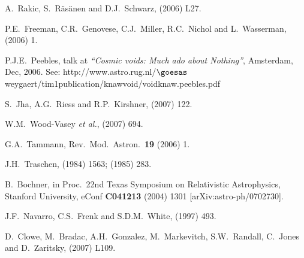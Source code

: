 \documentclass[12pt]{iopart}
\begin{document}
\begin{thebibliography}{66}
A.~Rakic, S.~R\"as\"anen and D.J.~Schwarz,
 (2006) L27. %

P.E.~Freeman, C.R.~Genovese, C.J.~Miller, R.C.~Nichol and L.~Wasserman,
 (2006) 1. %

P.J.E.~Peebles,
talk at {\em``Cosmic voids: Much ado about Nothing''}, Amsterdam,
Dec, 2006. See:\hfil\break
http://www.astro.rug.nl/$\goesas$weygaert/tim1publication/knawvoid/voidknaw.peebles.pdf

S.~Jha, A.G.~Riess and R.P.~Kirshner,
 (2007) 122. %

W.M.~Wood-Vasey {\it et al.},
 (2007) 694. %

G.A.~Tammann,
Rev.\ Mod.\ Astron.\ {\bf19} (2006) 1. %

J.H.~Traschen,
 (1984) 1563;
 (1985) 283.

B.~Bochner,
in Proc.\ 22nd Texas Symposium on Relativistic Astrophysics, Stanford
University, eConf {\bf C041213} (2004) 1301 [arXiv:astro-ph/0702730].

J.F.~Navarro, C.S.~Frenk and S.D.M.~White,
 (1997) 493. %

D.~Clowe, M.~Bradac, A.H.~Gonzalez, M.~Markevitch, S.W.~Randall, C.~Jones
and D.~Zaritsky,
 (2007) L109. %


\end{thebibliography}
\end{document}
